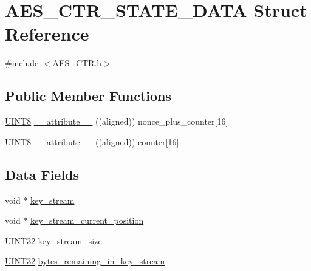 \hypertarget{struct_a_e_s___c_t_r___s_t_a_t_e___d_a_t_a}{}\section{A\+E\+S\+\_\+\+C\+T\+R\+\_\+\+S\+T\+A\+T\+E\+\_\+\+D\+A\+T\+A Struct Reference}
\label{struct_a_e_s___c_t_r___s_t_a_t_e___d_a_t_a}


{\ttfamily \#include $<$A\+E\+S\+\_\+\+C\+T\+R.\+h$>$}

\subsection*{Public Member Functions}
\begin{DoxyCompactItemize}
\item 
\hyperlink{_generic_type_defs_8h_ab27e9918b538ce9d8ca692479b375b6a}{U\+I\+N\+T8} \hyperlink{struct_a_e_s___c_t_r___s_t_a_t_e___d_a_t_a_a89b75f012593f0795176ba871792ecbc}{\+\_\+\+\_\+attribute\+\_\+\+\_\+} ((aligned)) nonce\+\_\+plus\+\_\+counter\mbox{[}16\mbox{]}
\item 
\hyperlink{_generic_type_defs_8h_ab27e9918b538ce9d8ca692479b375b6a}{U\+I\+N\+T8} \hyperlink{struct_a_e_s___c_t_r___s_t_a_t_e___d_a_t_a_a1389a060994e76c8163421955a75b5e3}{\+\_\+\+\_\+attribute\+\_\+\+\_\+} ((aligned)) counter\mbox{[}16\mbox{]}
\end{DoxyCompactItemize}
\subsection*{Data Fields}
\begin{DoxyCompactItemize}
\item 
void $\ast$ \hyperlink{struct_a_e_s___c_t_r___s_t_a_t_e___d_a_t_a_ac723120d7ded590dad56ce7c68bad1fb}{key\+\_\+stream}
\item 
void $\ast$ \hyperlink{struct_a_e_s___c_t_r___s_t_a_t_e___d_a_t_a_a3c812318caf3958da111ac64c4cd17c0}{key\+\_\+stream\+\_\+current\+\_\+position}
\item 
\hyperlink{_generic_type_defs_8h_a1720f33f59b583f0c2ed071815623a86}{U\+I\+N\+T32} \hyperlink{struct_a_e_s___c_t_r___s_t_a_t_e___d_a_t_a_a7eb68e0d44cc46f9d21543bfa2edf0e4}{key\+\_\+stream\+\_\+size}
\item 
\hyperlink{_generic_type_defs_8h_a1720f33f59b583f0c2ed071815623a86}{U\+I\+N\+T32} \hyperlink{struct_a_e_s___c_t_r___s_t_a_t_e___d_a_t_a_a7c5a67b278684e56128c4c4976914d42}{bytes\+\_\+remaining\+\_\+in\+\_\+key\+\_\+stream}
\end{DoxyCompactItemize}


